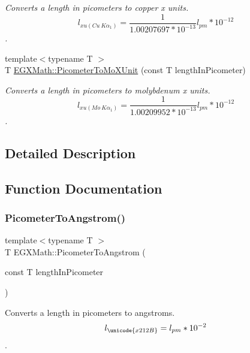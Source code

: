 \begin{DoxyCompactItemize}
\begin{DoxyCompactList}\small\item\em Converts a length in picometers to copper x units. \[ l_{xu(Cu\ K\alpha_1)}= \frac{1}{1.00207697*10^{-13}} l_{pm} * 10^{-12}\]. \end{DoxyCompactList}\item 
{\footnotesize template$<$typename T $>$ }\\T \mbox{\hyperlink{group___e_g_x_math-_conversions-_length_conversions-_picometer-_non-_s_i_ga51b96b4bb30b7e9c971db81ff89a82f8}{E\+G\+X\+Math\+::\+Picometer\+To\+Mo\+X\+Unit}} (const T length\+In\+Picometer)
\begin{DoxyCompactList}\small\item\em Converts a length in picometers to molybdenum x units. \[ l_{xu(Mo\ K\alpha_1)}=\frac{1}{1.00209952*10^{-13}} l_{pm} * 10^{-12}\]. \end{DoxyCompactList}\end{DoxyCompactItemize}


\subsection{Detailed Description}


\subsection{Function Documentation}
\mbox{\label{group___e_g_x_math-_conversions-_length_conversions-_picometer-_non-_s_i_ga0b1b4a3ec4ea0110477f4547025d2719}} 
\subsubsection{\texorpdfstring{Picometer\+To\+Angstrom()}{PicometerToAngstrom()}}
{\footnotesize\ttfamily template$<$typename T $>$ \\
T E\+G\+X\+Math\+::\+Picometer\+To\+Angstrom (\begin{DoxyParamCaption}\item[{const T}]{length\+In\+Picometer }\end{DoxyParamCaption})}



Converts a length in picometers to angstroms. \[ l_{\unicode{x212B}}=l_{pm} * 10^{-2} \]. 

